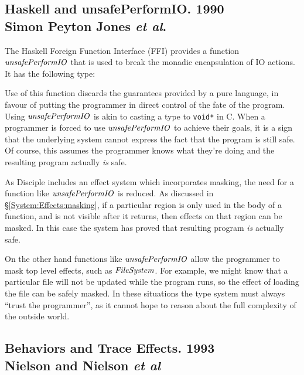  
\subsection{Haskell and unsafePerformIO. 1990 \\Simon Peyton Jones \emph{et al}. }
	
The Haskell Foreign Function Interface (FFI) \cite{haskell-ffi} provides a function \\ $\operatorname{\mathit{unsafePerformIO}}$ that is used to break the monadic encapsulation of IO actions. It has the following type:


Use of this function discards the guarantees provided by a pure language, in favour of putting the programmer in direct control of the fate of the program. Using $\operatorname{\mathit{unsafePerformIO}}$ is akin to casting a type to \texttt{void*} in C. When a programmer is forced to use $\operatorname{\mathit{unsafePerformIO}}$ to achieve their goals, it is a sign that the underlying system cannot express the fact that the program is still safe. Of course, this assumes the programmer knows what they're doing and the resulting program actually \emph{is} safe.

As Disciple includes an effect system which incorporates masking, the need for a function like $\operatorname{\mathit{unsafePerformIO}}$ is reduced. As discussed in \S\ref{System:Effects:masking}, if a particular region is only used in the body of a function, and is not visible after it returns, then effects on that region can be masked. In this case the system has proved that resulting program \emph{is} actually safe. 

On the other hand functions like $\operatorname{\mathit{unsafePerformIO}}$ allow the programmer to mask top level effects, such as $\operatorname{\mathit{FileSystem}}$. For example, we might know that a particular file will not be updated while the program runs, so the effect of loading the file can be safely masked. In these situations the type system must always ``trust the programmer'', as it cannot hope to reason about the full complexity of the outside world.


\subsection{Behaviors and Trace Effects. 1993 \\ Nielson and Nielson \emph{et al}}

